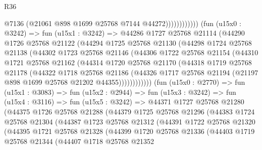 \begin{lexlean}{R36}
\begin{coremodule}
                              @7136
                              (@21061 @898 @1699 @25768 @7144 @44272))))))))))))
        (fun (u15x0 : @3242) =>
        fun (u15x1 : @3242) =>
        @44286
          @1727
          @25768
          @21114
          (@44290
            @1726
            @25768
            @21122
            (@44294
              @1725
              @25768
              @21130
              (@44298
                @1724
                @25768
                @21138
                (@44302
                  @1723
                  @25768
                  @21146
                  (@44306
                    @1722
                    @25768
                    @21154
                    (@44310
                      @1721
                      @25768
                      @21162
                      (@44314
                        @1720
                        @25768
                        @21170
                        (@44318
                          @1719
                          @25768
                          @21178
                          (@44322
                            @1718
                            @25768
                            @21186
                            (@44326
                              @1717
                              @25768
                              @21194
                              (@21197 @898 @1699 @25768 @21202 @44355))))))))))))
        (fun (u15x0 : @2770) =>
        fun (u15x1 : @3083) =>
        fun (u15x2 : @2944) =>
        fun (u15x3 : @3242) =>
        fun (u15x4 : @3116) =>
        fun (u15x5 : @3242) =>
        @44371
          @1727
          @25768
          @21280
          (@44375
            @1726
            @25768
            @21288
            (@44379
              @1725
              @25768
              @21296
              (@44383
                @1724
                @25768
                @21304
                (@44387
                  @1723
                  @25768
                  @21312
                  (@44391
                    @1722
                    @25768
                    @21320
                    (@44395
                      @1721
                      @25768
                      @21328
                      (@44399
                        @1720
                        @25768
                        @21336
                        (@44403
                          @1719
                          @25768
                          @21344
                          (@44407
                            @1718
                            @25768
                            @21352

\end{coremodule}
\end{lexlean}
